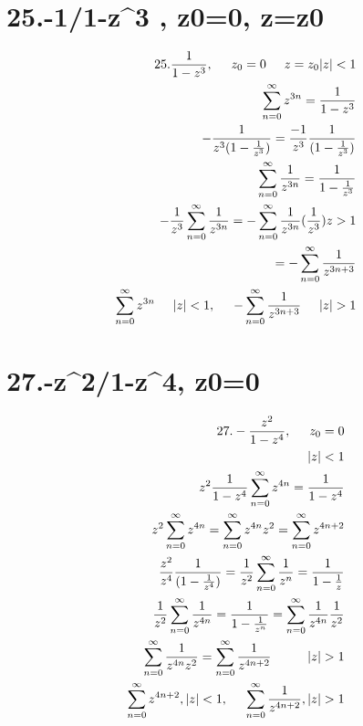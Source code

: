 \documentclass{article}
\begin{document}
\section*{25.-1/1-z^3 , z0=0, z=z0}
\begin{align*}
25. \frac{1}{1-z^3}, \hspace{0.5cm} z_0 = 0 \hspace{0.5cm} z = z_0 
|z| < 1 \\
\sum_{n=0}^\infty z^{3n} = \frac{1}{1-z^3} \\
-\frac{1}{z^3 (1-\frac{1}{z^3})} = \frac{-1}{z^3} \frac{1}{(1-\frac{1}{z^3})} \\
\sum_{n=0}^\infty \frac{1}{z^{3n}} = \frac{1}{1-\frac{1}{z^3}} \\
-\frac{1}{z^3} \sum_{n=0}^\infty \frac{1}{z^{3n}} = -\sum_{n=0}^\infty \frac{1}{z^{3n}} (\frac{1}{z^3})
z > 1 \\
= -\sum_{n=0}^\infty \frac{1}{z^{3n+3}} \\
\sum_{n=0}^\infty z^{3n} \hspace{0.5cm} |z| < 1, \hspace{0.5cm} -\sum_{n=0}^\infty \frac{1}{z^{3n+3}} \hspace{0.5cm} |z| > 1
\end{align*}
\section*{27.-z^2/1-z^4, z0=0 }
\begin{align*}
27.- \frac{z^2}{1-z^4}, \hspace{0.5cm} z_0 = 0 \\
|z| < 1 \\
z^2 \frac{1}{1-z^4} \sum_{n=0}^\infty z^{4n} = \frac{1}{1-z^4} \\
z^2 \sum_{n=0}^\infty z^{4n} = \sum_{n=0}^\infty z^{4n} z^2 = \sum_{n=0}^\infty z^{4n+2} \\
\frac{z^2}{z^4} \frac{1}{(1-\frac{1}{z^4})} = \frac{1}{z^2} \sum_{n=0}^\infty \frac{1}{z^{n}} = \frac{1}{1-\frac{1}{z}} \\
\frac{1}{z^2} \sum_{n=0}^\infty \frac{1}{z^{4n}} = \frac{1}{1-\frac{1}{z^n}} = \sum_{n=0}^\infty \frac{1}{z^{4n}} \frac{1}{z^2} \\
\sum_{n=0}^\infty \frac{1}{z^{4n} z^2} = \sum_{n=0}^\infty \frac{1}{z^{4n+2}} \hspace{1cm} |z| > 1 \\
\sum_{n=0}^\infty z^{4n+2}, |z| < 1, \hspace{0.5cm} \sum_{n=0}^\infty \frac{1}{z^{4n+2}}, |z| > 1
\end{align*}
\end{document}
